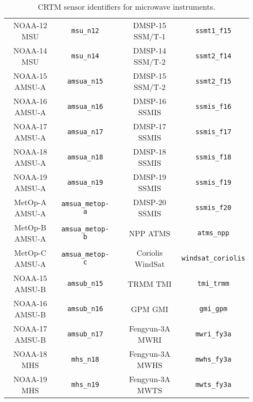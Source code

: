 \begin{table}[htp]
\begin{tabular}{c c c c c}
NOAA-12 MSU     & \texttt{msu\_n12}       & \hspace{0.2cm} & DMSP-15 SSM/T-1  & \texttt{ssmt1\_f15}        \\
NOAA-14 MSU     & \texttt{msu\_n14}       & \hspace{0.2cm} & DMSP-14 SSM/T-2  & \texttt{ssmt2\_f14}        \\
NOAA-15 AMSU-A  & \texttt{amsua\_n15}     & \hspace{0.2cm} & DMSP-15 SSM/T-2  & \texttt{ssmt2\_f15}        \\
NOAA-16 AMSU-A  & \texttt{amsua\_n16}     & \hspace{0.2cm} & DMSP-16 SSMIS    & \texttt{ssmis\_f16}        \\
NOAA-17 AMSU-A  & \texttt{amsua\_n17}     & \hspace{0.2cm} & DMSP-17 SSMIS    & \texttt{ssmis\_f17}        \\
NOAA-18 AMSU-A  & \texttt{amsua\_n18}     & \hspace{0.2cm} & DMSP-18 SSMIS    & \texttt{ssmis\_f18}        \\
NOAA-19 AMSU-A  & \texttt{amsua\_n19}     & \hspace{0.2cm} & DMSP-19 SSMIS    & \texttt{ssmis\_f19}        \\
MetOp-A AMSU-A  & \texttt{amsua\_metop-a} & \hspace{0.2cm} & DMSP-20 SSMIS    & \texttt{ssmis\_f20}        \\
MetOp-B AMSU-A  & \texttt{amsua\_metop-b} & \hspace{0.2cm} & NPP ATMS         & \texttt{atms\_npp}         \\
MetOp-C AMSU-A  & \texttt{amsua\_metop-c} & \hspace{0.2cm} & Coriolis WindSat & \texttt{windsat\_coriolis} \\
NOAA-15 AMSU-B  & \texttt{amsub\_n15}     & \hspace{0.2cm} & TRMM TMI         & \texttt{tmi\_trmm}         \\
NOAA-16 AMSU-B  & \texttt{amsub\_n16}     & \hspace{0.2cm} & GPM GMI          & \texttt{gmi\_gpm}          \\
NOAA-17 AMSU-B  & \texttt{amsub\_n17}     & \hspace{0.2cm} & Fengyun-3A MWRI  & \texttt{mwri\_fy3a}        \\
NOAA-18 MHS     & \texttt{mhs\_n18}       & \hspace{0.2cm} & Fengyun-3A MWHS  & \texttt{mwhs\_fy3a}        \\ 
NOAA-19 MHS     & \texttt{mhs\_n19}       & \hspace{0.2cm} & Fengyun-3A MWTS  & \texttt{mwts\_fy3a}        \\ 
    \hline
  \end{tabular}
  \caption{CRTM sensor identifiers for microwave instruments.}
  \label{tab:mw_sensor_id}
\end{table}


